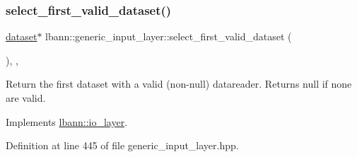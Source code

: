 \subsubsection{\texorpdfstring{select\+\_\+first\+\_\+valid\+\_\+dataset()}{select\_first\_valid\_dataset()}}
{\footnotesize\ttfamily \hyperlink{classlbann_1_1dataset}{dataset}$\ast$ lbann\+::generic\+\_\+input\+\_\+layer\+::select\+\_\+first\+\_\+valid\+\_\+dataset (\begin{DoxyParamCaption}{ }\end{DoxyParamCaption})\hspace{0.3cm}{\ttfamily [inline]}, {\ttfamily [override]}, {\ttfamily [virtual]}}

Return the first dataset with a valid (non-\/null) datareader. Returns null if none are valid. 

Implements \hyperlink{classlbann_1_1io__layer_a7dbc671fd5a81094854a4d865f7631ce}{lbann\+::io\+\_\+layer}.



Definition at line 445 of file generic\+\_\+input\+\_\+layer.\+hpp.


